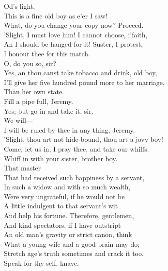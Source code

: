 \documentclass[a4paper,oneside,12pt]{memoir}
\begin{document}
\begin{drama*}
\kastrilspeaks {} Od's light,\\
This is a fine old boy as e'er I saw!\\
\lovewitspeaks What, do you change your copy now? Proceed.\\
\kastrilspeaks 'Slight, I must love him! I cannot choose, i'faith,\\
An I should be hanged for it! Suster, I protest,\\
I honour thee for this match.\\
\lovewitspeaks {} O, do you so, sir?\\
\kastrilspeaks Yes, an thou canst take tobacco and drink, old boy,\\
I'll give her five hundred pound more to her marriage,\\
Than her own state.\\
\lovewitspeaks {} Fill a pipe full, Jeremy.\\
\facespeaks Yes; but go in and take it, sir.\\
\lovewitspeaks {} We will---\\
I will be ruled by thee in any thing, Jeremy.\\
\kastrilspeaks 'Slight, thou art not hide-bound, thou art a jovy boy!\\
Come, let us in, I pray thee, and take our whiffs.\\
\lovewitspeaks Whiff in with your sister, brother boy.\\
 That master\\
That had received such happiness by a servant,\\
In such a widow and with so much wealth,\\
Were very ungrateful, if he would not be\\
A little indulgent to that servant's wit\\
And help his fortune. Therefore, gentlemen,\\
And kind spectators, if I have outstript\\
An old man's gravity or strict canon, think\\
What a young wife and a good brain may do;\\
Stretch age's truth sometimes and crack it too.\\
Speak for thy self, knave.\\

\end{drama*}
\end{document}
